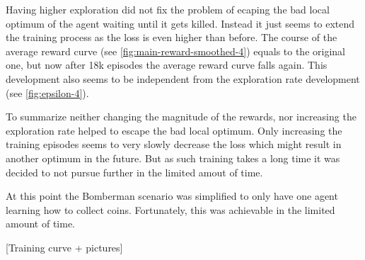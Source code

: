 Having higher exploration did not fix the problem of ecaping the bad local optimum of the agent waiting until it gets killed. Instead it just seems to extend the training process as the loss is even higher than before. The course of the average reward curve (see \autoref{fig:main-reward-smoothed-4}) equals to the original one, but now after 18k episodes the average reward curve falls again. This development also seems to be independent from the exploration rate development (see \autoref{fig:epsilon-4}). 

To summarize neither changing the magnitude of the rewards, nor increasing the exploration rate helped to escape the bad local optimum. Only increasing the training episodes seems to very slowly decrease the loss which might result in another optimum in the future. But as such training takes a long time it was decided to not pursue further in the limited amout of time. 

At this point the Bomberman scenario was simplified to only have one agent learning how to collect coins. Fortunately, this was achievable in the limited amount of time. 

[Training curve + pictures]



